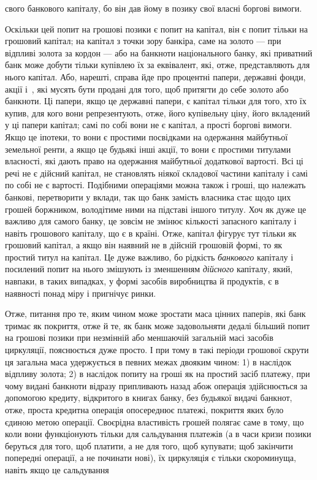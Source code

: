 \parcont{}  %
свого банкового капіталу, бо він дав йому в позику свої власні
боргові вимоги.

Оскільки цей попит на грошові позики є попит на капітал,
він є попит тільки на грошовий капітал; на капітал з точки
зору банкіра, саме на золото — при відпливі золота за кордон —
або на банкноти національного банку, які приватний банк може
добути тільки купівлею їх за еквівалент, які, отже, представляють
для нього капітал. Або, нарешті, справа йде про процентні
папери, державні фонди, акції і~, які мусять бути
продані для того, щоб притягти до себе золото або банкноти.
Ці папери, якщо це державні папери, є капітал тільки для
того, хто їх купив, для кого вони репрезентують, отже, його
купівельну ціну, його вкладений у ці папери капітал; самі по
собі вони не є капітал, а прості боргові вимоги. Якщо це
іпотеки, то вони є простими посвідками на одержання майбутньої
земельної ренти, а якщо це будьякі інші акції, то вони
є простими титулами власності, які дають право на одержання
майбутньої додаткової вартості. Всі ці речі не є дійсний капітал,
не становлять ніякої складової частини капіталу і самі по собі
не є вартості. Подібними операціями можна також і гроші, що
належать банкові, перетворити у вклади, так що банк замість
власника стає щодо цих грошей боржником, володітиме ними
на підставі іншого титулу. Хоч як дуже це важливо для самого
банку, це зовсім не змінює кількості запасного капіталу і навіть
грошового капіталу, що є в країні. Отже, капітал фігурує тут
тільки як грошовий капітал, а якщо він наявний не в дійсній
грошовій формі, то як простий титул на капітал. Це дуже важливо,
бо рідкість \emph{банкового} капіталу і посилений попит на нього
змішують із зменшенням \emph{дійсного} капіталу, який, навпаки, в таких
випадках, у формі засобів виробництва й продуктів, є в наявності
понад міру і пригнічує ринки.

Отже, питання про те, яким чином може зростати маса цінних
паперів, які банк тримає як покриття, отже й те, як банк
може задовольняти дедалі більший попит на грошові позики при
незмінній або меншаючій загальній масі засобів циркуляції,
пояснюється дуже просто. І при тому в такі періоди грошової
скрути ця загальна маса удержується в певних межах двояким
чином: 1) в наслідок відпливу золота; 2) в наслідок попиту на
гроші як на простий засіб платежу, при чому видані банкноти
відразу припливають назад абож операція здійснюється за
допомогою кредиту, відкритого в книгах банку, без будьякої
видачі банкнот, отже, проста кредитна операція опосереднює
платежі, покриття яких було єдиною метою операції. Своєрідна
властивість грошей полягає саме в тому, що коли вони
функціонують тільки для сальдування платежів (а в часи кризи
позики беруться для того, щоб платити, а не для того, щоб
купувати; щоб закінчити попередні операції, а не починати нові), їх
циркуляція є тільки скороминуща, навіть якщо це сальдування
\parbreak{}  %
